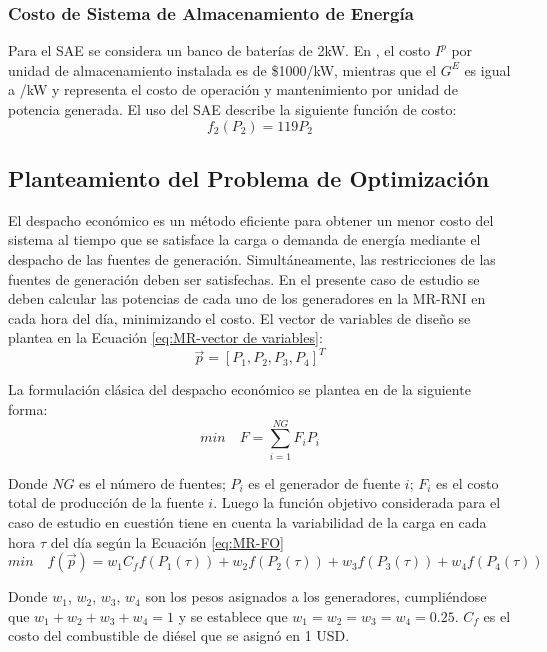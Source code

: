 \subsubsection{Costo de Sistema de Almacenamiento de Energía}
Para el SAE se considera un banco de baterías de 2kW. En \cite{zapata_zapata_control_2017}, el costo $I^p$ por unidad de almacenamiento instalada es de \$1000/kW, mientras que el $G^E$ es igual a /kW y representa el costo de operación y mantenimiento por unidad de potencia generada. El uso del SAE describe la siguiente función de costo:
\begin{equation}\label{eq:ESS}
f_2(P_2) = 119P_2
\end{equation}
\subsection{Planteamiento del Problema de Optimización}
El despacho económico es un método eficiente para obtener un menor costo del sistema al tiempo que se satisface la carga o demanda de energía mediante el despacho de las fuentes de generación. Simultáneamente, las restricciones de las fuentes de generación deben ser satisfechas. En el presente caso de estudio se deben calcular las potencias de cada uno de los generadores en la MR-RNI en cada hora del día, minimizando el costo. El vector de variables de diseño se plantea en la Ecuación  \ref{eq:MR-vector de variables}:
 \begin{equation}\label{eq:MR-vector de variables}
  \vec{p}=\left[ P_1,P_2,P_3,P_4 \right]^T
 \end{equation}


La formulación clásica del despacho económico se plantea en \cite{Ramabhotla_Economic_dispatch} de la siguiente forma:
 \begin{equation}
 min\quad  F=
 \sum_{i=1}^{NG}F_{i}P_{i} 
 \end{equation}

Donde $NG$ es el número de fuentes; $P_{i}$ es el generador de fuente $i$; $F_{i}$ es el costo total de producción de la fuente $i$. Luego la función objetivo considerada para el caso de estudio en cuestión tiene en cuenta la variabilidad de la carga en cada hora  $\tau$ del día según la Ecuación \ref{eq:MR-FO}
 \begin{equation}\label{eq:MR-FO}
min \quad f(\vec{p} ) = w_1C_f f(P_1(\tau)) + w_2f(P_2(\tau)) + w_3f(P_3(\tau))+ w_4f(P_4(\tau))
 \end{equation}
 
Donde $w_1$, $w_2$, $w_3$, $w_4$ son los pesos asignados a los generadores, cumpliéndose que  $w_1+ w_2+w_3+w_4=1$ y  se establece que $w_1=w_2=w_3=w_4=0.25$. $C_f$ es el costo del combustible de diésel que se asignó en 1 USD.


